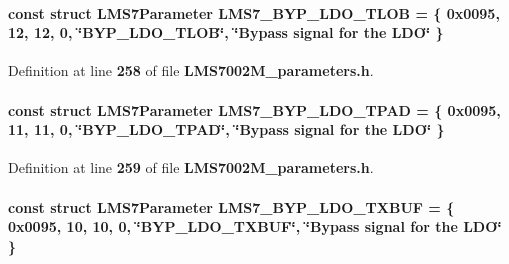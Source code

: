 \paragraph[{L\+M\+S7\+\_\+\+B\+Y\+P\+\_\+\+L\+D\+O\+\_\+\+T\+L\+OB}]{\setlength{\rightskip}{0pt plus 5cm}const struct {\bf L\+M\+S7\+Parameter} L\+M\+S7\+\_\+\+B\+Y\+P\+\_\+\+L\+D\+O\+\_\+\+T\+L\+OB = \{ 0x0095, 12, 12, 0, \char`\"{}\+B\+Y\+P\+\_\+\+L\+D\+O\+\_\+\+T\+L\+O\+B\char`\"{}, \char`\"{}\+Bypass signal for the L\+D\+O\char`\"{} \}\hspace{0.3cm}{\ttfamily [static]}}\label{LMS7002M__parameters_8h_a9461603e41a3d3f0c55310100db293d8}


Definition at line {\bf 258} of file {\bf L\+M\+S7002\+M\+\_\+parameters.\+h}.

\paragraph[{L\+M\+S7\+\_\+\+B\+Y\+P\+\_\+\+L\+D\+O\+\_\+\+T\+P\+AD}]{\setlength{\rightskip}{0pt plus 5cm}const struct {\bf L\+M\+S7\+Parameter} L\+M\+S7\+\_\+\+B\+Y\+P\+\_\+\+L\+D\+O\+\_\+\+T\+P\+AD = \{ 0x0095, 11, 11, 0, \char`\"{}\+B\+Y\+P\+\_\+\+L\+D\+O\+\_\+\+T\+P\+A\+D\char`\"{}, \char`\"{}\+Bypass signal for the L\+D\+O\char`\"{} \}\hspace{0.3cm}{\ttfamily [static]}}\label{LMS7002M__parameters_8h_acc8c13afd9a539b59a4700c5069e7fa1}


Definition at line {\bf 259} of file {\bf L\+M\+S7002\+M\+\_\+parameters.\+h}.

\paragraph[{L\+M\+S7\+\_\+\+B\+Y\+P\+\_\+\+L\+D\+O\+\_\+\+T\+X\+B\+UF}]{\setlength{\rightskip}{0pt plus 5cm}const struct {\bf L\+M\+S7\+Parameter} L\+M\+S7\+\_\+\+B\+Y\+P\+\_\+\+L\+D\+O\+\_\+\+T\+X\+B\+UF = \{ 0x0095, 10, 10, 0, \char`\"{}\+B\+Y\+P\+\_\+\+L\+D\+O\+\_\+\+T\+X\+B\+U\+F\char`\"{}, \char`\"{}\+Bypass signal for the L\+D\+O\char`\"{} \}\hspace{0.3cm}{\ttfamily [static]}}\label{LMS7002M__parameters_8h_adf13d2761cf20f5155358b377793ec23}


